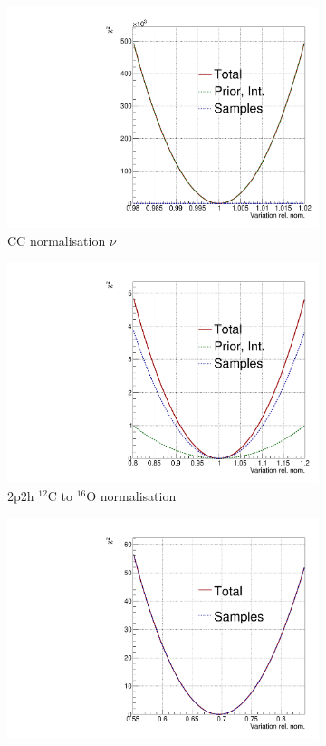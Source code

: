 \begin{figure}
\centering
\begin{subfigure}{.49\textwidth}
  \centering
  \includegraphics[width=0.7\linewidth]{figs/llh/CC_norm_nu_llh.pdf}
  \caption{CC normalisation $\nu$}
\end{subfigure}
\begin{subfigure}{.49\textwidth}
  \centering
  \includegraphics[width=0.7\linewidth]{figs/llh/2p2h_normCtoO_llh.pdf}
  \caption{2p2h $^{12}$C  to $^{16}$O normalisation}
\end{subfigure}
\begin{subfigure}{.49\textwidth}
  \centering
  \includegraphics[width=0.7\linewidth]{figs/llh/Q2_norm_1_llh.pdf}

\end{subfigure}
\end{figure}
